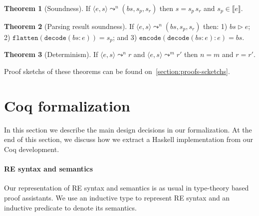 \documentclass[review]{elsarticle}
\newcommand{\sembrackets}[1]{\ensuremath{\llbracket #1 \rrbracket}}
\newcommand{\flatten}{\ensuremath{\texttt{flatten}}}
\newcommand{\code}{\ensuremath{\texttt{encode}}}
\newcommand{\decodee}{\ensuremath{\texttt{decode}}}
\theoremstyle{definition}
\newtheorem{Theorem}{Theorem}
\begin{document}
\begin{Theorem}[Soundness]\label{theorem:semanticssoundness}
  If $\langle e, s \rangle \leadsto^n (bs,s_p,s_r)$ then $s = s_p\,s_r$ and $s_p\in\sembrackets{e}$.
\end{Theorem}


\begin{Theorem}[Parsing result soundness]
  If $\langle e, s \rangle \leadsto^n (bs,s_p,s_r)$ then: 1) $bs \rhd e$; 2) $\flatten(\decodee(bs : e)) = s_p$; and 3)
  $\code(\decodee(bs : e) : e) = bs$. 
\end{Theorem}

\begin{Theorem}[Determinism]\label{theorem:semanticsdeterministic}
  If $\langle e, s \rangle \leadsto^n r$ and $\langle e, s \rangle \leadsto^m r'$
  then $n = m$ and $r = r'$.
\end{Theorem}

Proof sketchs of these theorems can be found on~\ref{section:proofs-scketchs}.

\section{Coq formalization}\label{section:formalization}

In this section we describe the main design decisions in our formalization. At
the end of this section, we discuss how we extract a Haskell implementation from
our Coq development.

\paragraph{RE syntax and semantics} Our representation of RE syntax and
semantics is as usual in type-theory based proof assistants. We use an inductive
type to represent RE syntax and an inductive predicate to denote its semantics.
\end{document}
